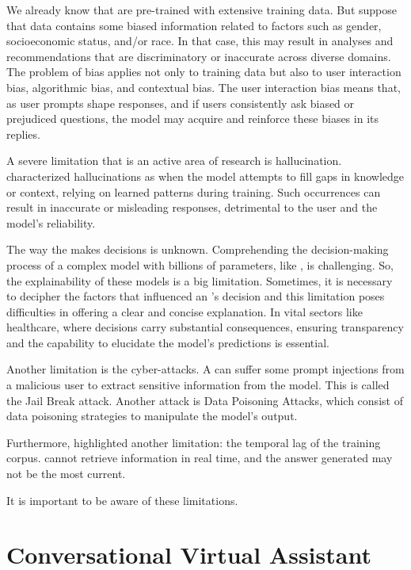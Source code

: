We already know that {\llm} are pre-trained with extensive training data. But suppose that data contains some biased information related to factors such as gender, socioeconomic status, and/or race. In that case, this may result in analyses and recommendations that are discriminatory or inaccurate across diverse domains. The problem of bias applies not only to training data but also to user interaction bias, algorithmic bias, and contextual bias. The user interaction bias means that, as user prompts shape responses, and if users consistently ask biased or prejudiced questions, the model may acquire and reinforce these biases in its replies.

A severe limitation that is an active area of research is hallucination. \citet{hadi_LLM_2023} characterized {\llm} hallucinations as when the model attempts to fill gaps in knowledge or context, relying on learned patterns during training. Such occurrences can result in inaccurate or misleading responses, detrimental to the user and the model's reliability.

The way the {\llm} makes decisions is unknown. Comprehending the decision-making process of a complex model with billions of parameters, like {\llm}, is challenging. So, the explainability of these models is a big limitation. Sometimes, it is necessary to decipher the factors that influenced an {\llm}'s decision and this limitation poses difficulties in offering a clear and concise explanation. In vital sectors like healthcare, where decisions carry substantial consequences, ensuring transparency and the capability to elucidate the model's predictions is essential.

Another limitation is the cyber-attacks. A {\llm} can suffer some prompt injections from a malicious user to extract sensitive information from the model. This is called the Jail Break attack. Another attack is Data Poisoning Attacks, which consist of data poisoning strategies to manipulate the model's output.

Furthermore, \citet{liu_prompting_nodate} highlighted another limitation: the temporal lag of the training corpus. {\llm} cannot retrieve information in real time, and the answer generated may not be the most current.

It is important to be aware of these limitations.


\section{Conversational Virtual Assistant}


